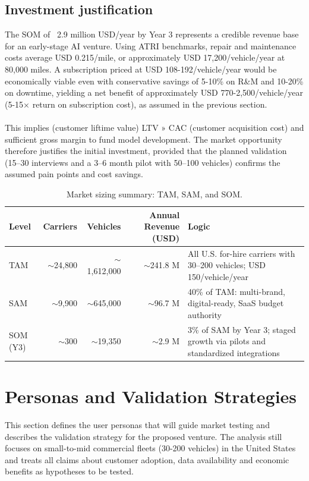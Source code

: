 \documentclass[11pt,a4paper]{article}
\begin{document}
\subsection{Investment justification}
The SOM of ~2.9 million USD/year by Year 3 represents a credible revenue base for an early-stage AI venture. Using ATRI benchmarks, repair and maintenance costs average USD 0.215/mile, or approximately USD 17,200/vehicle/year at 80,000 miles. A subscription priced at USD 108-192/vehicle/year would be economically viable even with conservative savings of 5-10\% on R\&M and 10-20\% on downtime, yielding a net benefit of approximately USD 770-2,500/vehicle/year (5-15× return on subscription cost), as assumed in the previous section. 
\\
\\ 
This implies (customer liftime value) LTV » CAC (customer acquisition cost) and sufficient gross margin to fund model development. The market opportunity therefore justifies the initial investment, provided that the planned validation (15–30 interviews and a 3–6 month pilot with 50–100 vehicles) confirms the assumed pain points and cost savings.


\begin{table}[h!]
\centering
\small
\begin{tabularx}{\linewidth}{l r r r X}
\toprule
\textbf{Level} & \textbf{Carriers} & \textbf{Vehicles} & \textbf{Annual Revenue (USD)} & \textbf{Logic} \\
\midrule
TAM & $\sim$24,800 & $\sim$1,612,000 & $\sim$241.8 M &
All U.S. for-hire carriers with 30--200 vehicles; USD 150/vehicle/year \\
SAM & $\sim$9,900 & $\sim$645,000 & $\sim$96.7 M &
40\% of TAM: multi-brand, digital-ready, SaaS budget authority \\
SOM (Y3) & $\sim$300 & $\sim$19,350 & $\sim$2.9 M &
3\% of SAM by Year 3; staged growth via pilots and standardized integrations \\
\bottomrule
\end{tabularx}
\caption{Market sizing summary: TAM, SAM, and SOM.}
\label{tab:market-sizing}
\end{table}


\section{Personas and Validation Strategies}
\noindent This section defines the user personas that will guide market testing and describes the validation strategy for the proposed venture. The analysis still focuses on small-to-mid commercial fleets (30-200 vehicles) in the United States and treats all claims about customer adoption, data availability and economic benefits as hypotheses to be tested.
\end{document}

